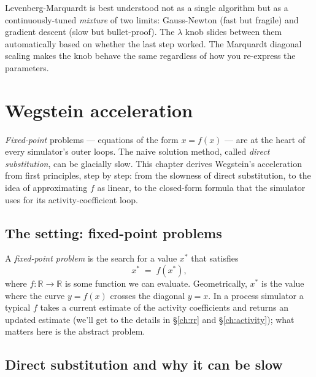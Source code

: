 \documentclass[11pt,a4paper]{article}
\newcommand{\R}{\mathbb{R}}
\begin{document}
\begin{intuition}
Levenberg-Marquardt is best understood not as a single algorithm but
as a continuously-tuned \emph{mixture} of two limits: Gauss-Newton
(fast but fragile) and gradient descent (slow but bullet-proof). The
$\lambda$ knob slides between them automatically based on whether the
last step worked. The Marquardt diagonal scaling makes the knob
behave the same regardless of how you re-express the parameters.
\end{intuition}

\section{Wegstein acceleration}\label{ch:wegstein}

\begin{whatyoulllearn}
\emph{Fixed-point} problems --- equations of the form $x = f(x)$ ---
are at the heart of every simulator's outer loops.  The naive
solution method, called \emph{direct substitution}, can be glacially
slow.  This chapter derives Wegstein's acceleration from first
principles, step by step: from the slowness of direct substitution,
to the idea of approximating $f$ as linear, to the closed-form
formula that the simulator uses for its activity-coefficient loop.
\end{whatyoulllearn}

\subsection{The setting: fixed-point problems}

A \emph{fixed-point problem} is the search for a value $x^{\!*}$
that satisfies
\begin{equation}
   x^{\!*} \;=\; f(x^{\!*}),
   \label{eq:fixed-point}
\end{equation}
where $f \colon \R \to \R$ is some function we can evaluate.
Geometrically, $x^{\!*}$ is the value where the curve $y = f(x)$
crosses the diagonal $y = x$.  In a process simulator a typical
$f$ takes a current estimate of the activity coefficients and
returns an updated estimate (we'll get to the details in
\S\ref{ch:rr} and \S\ref{ch:activity}); what matters here is the
abstract problem.

\subsection{Direct substitution and why it can be slow}
\end{document}
